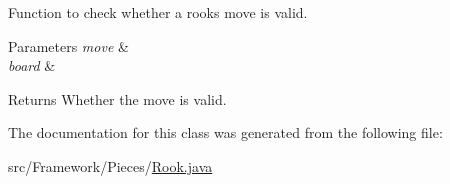 Function to check whether a rook\textquotesingle{}s move is valid. 
\begin{DoxyParams}{Parameters}
{\em move} & \\
\hline
{\em board} & \\
\hline
\end{DoxyParams}
\begin{DoxyReturn}{Returns}
Whether the move is valid. 
\end{DoxyReturn}


The documentation for this class was generated from the following file\+:\begin{DoxyCompactItemize}
\item 
src/\+Framework/\+Pieces/\hyperlink{_rook_8java}{Rook.\+java}\end{DoxyCompactItemize}
